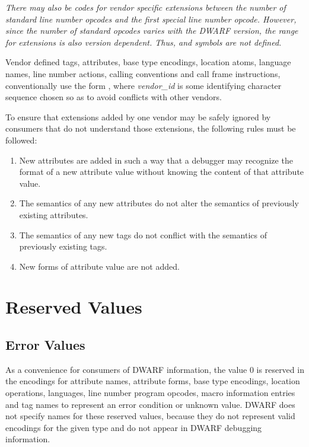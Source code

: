\textit{There may also be codes for vendor specific extensions
between the number of standard line number opcodes and
the first special line number opcode. However, since the
number of standard opcodes varies with the DWARF version,
the range for extensions is also version dependent. Thus,
\DWLNSlouserTARG{} and 
\DWLNShiuserTARG{} symbols are not defined.}

Vendor defined tags, attributes, base type encodings, location
atoms, language names, line number actions, calling conventions
and call frame instructions, conventionally use the form
, where 
\textit{vendor\_id} is some identifying
character sequence chosen so as to avoid conflicts with
other vendors.

To ensure that extensions added by one vendor may be safely
ignored by consumers that do not understand those extensions,
the following rules must be followed:
\begin{enumerate}[1. ]

\item New attributes are added in such a way that a
debugger may recognize the format of a new attribute value
without knowing the content of that attribute value.

\item The semantics of any new attributes do not alter
the semantics of previously existing attributes.

\item The semantics of any new tags do not conflict with
the semantics of previously existing tags.

\item New forms of attribute value are not added.

\end{enumerate}


\section{Reserved Values}
\label{datarep:reservedvalues}
\subsection{Error Values}
\label{datarep:errorvalues}

As 
a convenience for consumers of DWARF information, the value
0 is reserved in the encodings for attribute names, attribute
forms, base type encodings, location operations, languages,
line number program opcodes, macro information entries and tag
names to represent an error condition or unknown value. DWARF
does not specify names for these reserved values, because they
do not represent valid encodings for the given type and do
not appear in DWARF debugging information.


